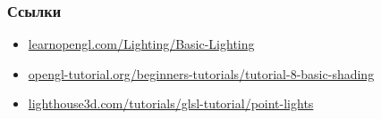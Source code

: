 \documentclass{beamer}
\begin{document}
\begin{frame}[fragile]
\frametitle{Ссылки}
\begin{itemize}
\item \href{https://learnopengl.com/Lighting/Basic-Lighting}{learnopengl.com/Lighting/Basic-Lighting}
\item \href{http://www.opengl-tutorial.org/beginners-tutorials/tutorial-8-basic-shading}{opengl-tutorial.org/beginners-tutorials/tutorial-8-basic-shading}
\item \href{https://www.lighthouse3d.com/tutorials/glsl-tutorial/point-lights}{lighthouse3d.com/tutorials/glsl-tutorial/point-lights}
\end{itemize}
\end{frame}
\end{document}
